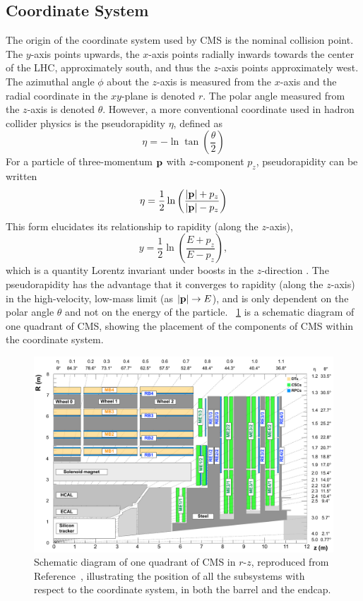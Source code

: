 \subsection{Coordinate System}
The origin of the coordinate system used by CMS is the nominal \pp collision point.
The $y$-axis points upwards, the $x$-axis points radially inwards towards the center of the LHC, approximately south, and thus the $z$-axis points approximately west.
The azimuthal angle $\phi$ about the $z$-axis is measured from the $x$-axis and the radial coordinate in the $xy$-plane is denoted $r$.
The polar angle measured from the $z$-axis is denoted $\theta$.
However, a more conventional coordinate used in hadron collider physics is the pseudorapidity $\eta$, defined as
\begin{equation}
  \eta = -\ln\tan\left(\frac{\theta}{2}\right)
  \label{eq:eta}
\end{equation}
For a particle of three-momentum $\mathbf{p}$ with $z$-component $p_z$, pseudorapidity can be written
\begin{equation}
  \eta = \frac12\ln\left(\frac{|\mathbf{p}|+p_z}{|\mathbf{p}|-p_z}\right)
  \label{eq:eta_p}
\end{equation}
This form elucidates its relationship to rapidity (along the $z$-axis),
\begin{equation}
  y = \frac12\ln\left(\frac{E+p_z}{E-p_z}\right),
  \label{eq:rap}
\end{equation}
which is a quantity Lorentz invariant under boosts in the $z$-direction \cite{Hama:1981}.
The pseudorapidity has the advantage that it converges to rapidity (along the $z$-axis) in the high-velocity, low-mass limit (as $|\mathbf{p}|\to E$), and is only dependent on the polar angle $\theta$ and not on the energy of the particle.
\Fig~\ref{cms:quadrant} is a schematic diagram of one quadrant of CMS, showing the placement of the components of CMS within the coordinate system.
\begin{figure}[tpb]
  \centering
  \includegraphics[width=\textwidth]{figures/cms/CMSGeometry.pdf}
  \caption[Schematic diagram of one quadrant of CMS in $r$-$z$.]{Schematic diagram of one quadrant of CMS in $r$-$z$, reproduced from Reference~\cite{Sirunyan:2018fpa}, illustrating the position of all the subsystems with respect to the coordinate system, in both the barrel and the endcap.}
  \label{cms:quadrant}
\end{figure}

